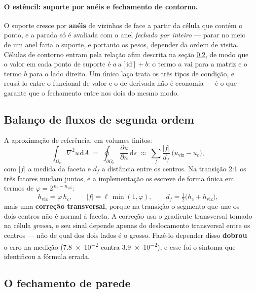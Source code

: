 \paragraph{O estêncil: suporte por anéis e fechamento de contorno.} O suporte
cresce por \textbf{anéis} de vizinhos de face a partir da célula que contém o
ponto, e a parada só é avaliada com o anel \emph{fechado por inteiro} --- parar no
meio de um anel faria o suporte, e portanto os pesos, depender da ordem de
visita. Células de contorno entram pela relação afim descrita na seção
\ref{sec:aprox-bc}, de modo que o valor em cada ponto de suporte é
$a\,u[\mathrm{id}] + b$: o termo $a$ vai para a matriz e o termo $b$ para o lado
direito. Um único laço trata os três tipos de condição, e reusá-lo entre o
funcional de valor e o de derivada não é economia --- é o que garante que o
fechamento entre nos dois do mesmo modo.

\subsection{Balanço de fluxos de segunda ordem}
\label{sec:aprox-fluxo}

A aproximação de referência, em volumes finitos:
\begin{equation}
  \int_{\Omega_c} \nabla^2 u \,\mathrm{d}A
  \;=\; \oint_{\partial\Omega_c} \frac{\partial u}{\partial n} \,\mathrm{d}s
  \;\approx\; \sum_{f} \frac{|f|}{d_f}\,\bigl(u_{\mathrm{viz}} - u_c\bigr),
  \label{eq:fv}
\end{equation}
com $|f|$ a medida da faceta e $d_f$ a distância entre os centros. Na transição
2:1 os três fatores mudam juntos, e a implementação os escreve de forma única em
termos de $\varphi = 2^{\,n_c - n_{\mathrm{viz}}}$:
\begin{equation}
  h_{\mathrm{viz}} = \varphi\,h_c,
  \qquad
  |f| = \ell\,\min(1,\varphi),
  \qquad
  d_f = \tfrac{1}{2}\bigl(h_c + h_{\mathrm{viz}}\bigr),
  \label{eq:fv-transicao}
\end{equation}
mais uma \textbf{correção transversal}, porque na transição o segmento que une os
dois centros não é normal à faceta. A correção usa o gradiente transversal tomado
na célula \emph{grossa}, e seu sinal depende apenas do deslocamento transversal
entre os centros --- não de qual dos dois lados é o grosso. Fazê-lo depender disso
\textbf{dobrou} o erro na medição (\num{7.8e-2} contra \num{3.9e-2}), e esse foi o
sintoma que identificou a fórmula errada.

\subsection{O fechamento de parede}
\label{sec:aprox-bc}


